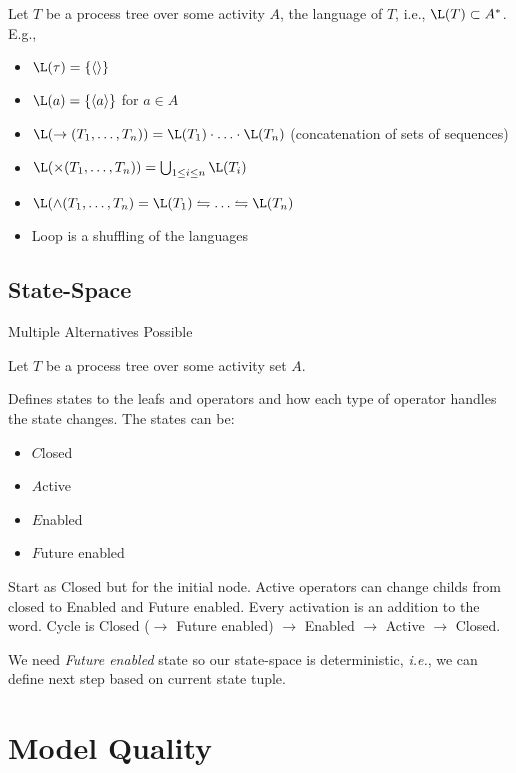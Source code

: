 Let $T$ be a process tree over some activity $A$, the language of $T$, i.e., $\L(T) \subset A^{*}$. E.g.,

\begin{itemize}
	\item $\L(\tau) = \left\{ \left< \right> \right\} $
	\item $\L(a) = \left\{ \left<a \right> \right\} $ for $a\in A$
	\item $\L(\to (T_1,\ldots,T_n)) = \L(T_1) \cdot \ldots \cdot  \L(T_n)$ (concatenation of sets of sequences)
	\item $\L(\times (T_1, \ldots, T_n)) = \bigcup_{1 \le i\le n} \L(T_i) $
	\item $\L( \wedge (T_1, \ldots, T_n) = \L(T_1) \leftrightharpoons \ldots \leftrightharpoons \L(T_n)$
	\item Loop is a shuffling of the languages
\end{itemize}

\subsection*{State-Space}

Multiple Alternatives Possible

Let $T$ be a process tree over some activity set $A$.

Defines states to the leafs and operators and how each type of operator handles the state changes. The states can be:
\begin{itemize}
	\item \textbf{$C$}losed
	\item \textbf{$A$}ctive
	\item  $E$nabled
	\item $F$uture enabled
\end{itemize}

Start as Closed but for the initial node. Active operators can change childs from closed to Enabled and Future enabled. Every activation is an addition to the word. Cycle is Closed ($\to $ Future enabled) $\to $ Enabled $\to $ Active $\to $ Closed.

\begin{remark}
	We need \emph{Future enabled} state so our state-space is deterministic, \emph{i.e.}, we can define next step based on current state tuple.
\end{remark}

\section*{Model Quality}

